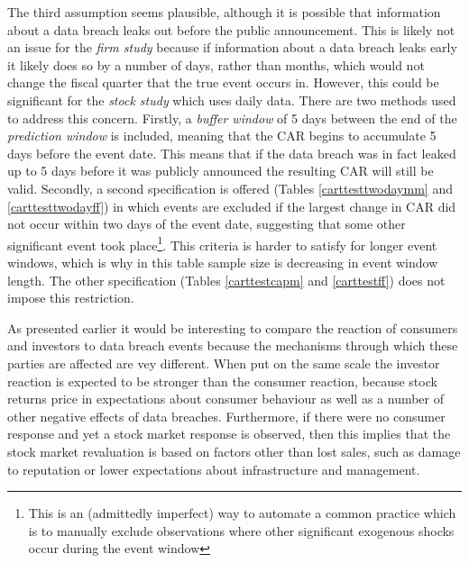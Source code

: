 \documentclass[../Main.tex]{subfiles}
\begin{document}
The third assumption seems plausible, although it is possible that information about a data breach leaks out before the public announcement. This is likely not an issue for the \textit{firm study} because if information about a data breach leaks early it likely does so by a number of days, rather than months, which would not change the fiscal quarter that the true event occurs in. However, this could be significant for the \textit{stock study} which uses daily data. There are two methods used to address this concern. Firstly, a \textit{buffer window} of 5 days between the end of the \textit{prediction window} is included, meaning that the CAR begins to accumulate 5 days before the event date. This means that if the data breach was in fact leaked up to 5 days before it was publicly announced the resulting CAR will still be valid. Secondly, a second specification is offered (Tables \ref{carttesttwodaymm} and \ref{carttesttwodayff}) in which events are excluded if the largest change in CAR did not occur within two days of the event date, suggesting that some other significant event took place\footnote{This is an (admittedly imperfect) way to automate a common practice which is to manually exclude observations where other significant exogenous shocks occur during the event window}. This criteria is harder to satisfy for longer event windows, which is why in this table sample size is decreasing in event window length. The other specification (Tables \ref{carttestcapm} and \ref{carttestff}) does not impose this restriction.

As presented earlier it would be interesting to compare the reaction of consumers and investors to data breach events because the mechanisms through which these parties are affected are vey different. When put on the same scale the investor reaction is expected to be stronger than the consumer reaction, because stock returns price in expectations about consumer behaviour as well as a number of other negative effects of data breaches. Furthermore, if there were no consumer response and yet a stock market response is observed, then this implies that the stock market revaluation is based on factors other than lost sales, such as damage to reputation or lower expectations about infrastructure and management.

\biblio %
\end{document}
